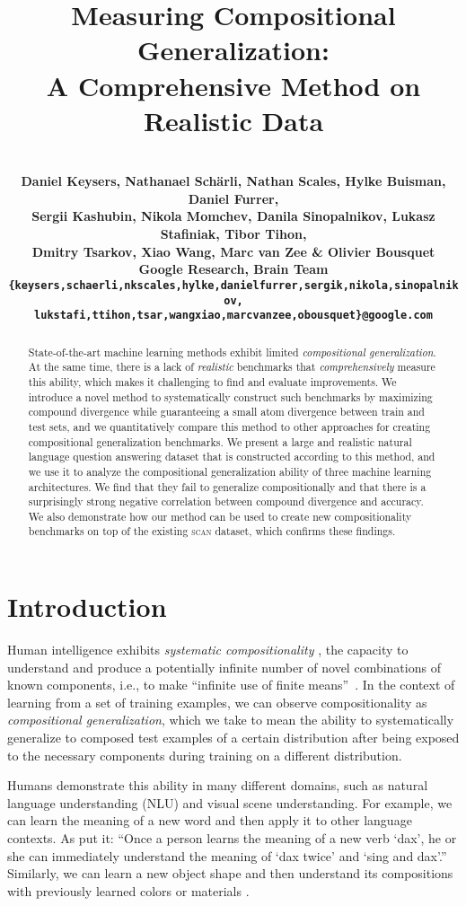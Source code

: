 \documentclass[letterpaper]{article}
\title{Measuring Compositional Generalization:\\ A Comprehensive Method on Realistic Data}
\author{\\[-4ex]\bf Daniel Keysers,
Nathanael Sch\"arli,
Nathan Scales,
Hylke Buisman,
Daniel Furrer,\\
\bf Sergii Kashubin,
Nikola Momchev,
Danila Sinopalnikov,
Lukasz Stafiniak,
Tibor Tihon,\\
\bf Dmitry Tsarkov,
Xiao Wang,
Marc van Zee \&
Olivier Bousquet \\[0.5ex]
Google Research, Brain Team \\[0.5ex]
\small
\texttt{\{keysers,schaerli,nkscales,hylke,danielfurrer,}\texttt{sergik,nikola,sinopalnikov,}\\ 
\texttt{lukstafi,ttihon,}\texttt{tsar,wangxiao,marcvanzee,obousquet\}@google.com}
\vspace{-3ex}}
\newcommand{\SCAN}{\textsc{scan}}
\begin{document}
\maketitle
\begin{abstract}
\vspace{-2.5ex}State-of-the-art machine learning methods exhibit limited {\em compositional generalization}.
At the same time, there is a lack of {\em realistic} benchmarks that {\em comprehensively} measure this ability, which makes it challenging to find and evaluate improvements.
We introduce a novel method to systematically construct such benchmarks by maximizing compound divergence while guaranteeing a small atom divergence between train and test sets, and we quantitatively compare this method to other approaches for creating compositional generalization benchmarks.
We present a large and realistic natural language question answering dataset that is constructed according to this method, and we use it to analyze the compositional generalization ability of three machine learning architectures. We find that they fail to generalize compositionally and that there is a surprisingly strong negative correlation between compound divergence and accuracy.
We also demonstrate how our method can be used to create new compositionality benchmarks on top of the existing \SCAN{} dataset, which confirms these findings.
\vspace{-1ex}\end{abstract}

\section{Introduction}
\label{sect:introduction}
\vspace{-2ex}Human intelligence exhibits {\em systematic compositionality} \citep{fodor1988compositionality}, the capacity to understand and produce a potentially infinite number of novel combinations of  known components, i.e., to make ``infinite use of  finite means''~\citep{chomsky1965}. 
In the context of learning from a set of training examples, we can observe compositionality as {\em compositional generalization}, which we take to mean the ability to systematically generalize to composed test examples of a certain distribution after being exposed to the necessary components during training on a different distribution.

Humans demonstrate this ability in many different domains, such as natural language understanding (NLU) and visual scene understanding. For example, we can learn the meaning of a new word and then apply it to other language contexts. As \citet{Lake2018GeneralizationWS} put it: ``Once a person learns the meaning of a new verb `dax', he or she can immediately understand the meaning of `dax twice' and `sing and dax'.''
Similarly, we can learn a new object shape and then understand its compositions with previously learned colors or materials \citep{CLEVR,higgins2017scan}.
\end{document}
